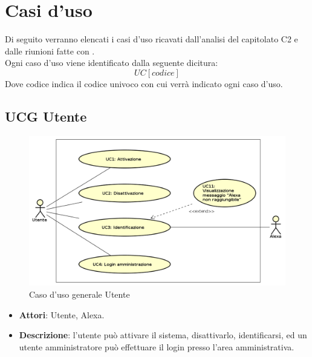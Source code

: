 \documentclass[../AnalisiDeiRequisiti.tex]{subfiles}
\begin{document}
\section{Casi d'uso}
Di seguito verranno elencati i casi d'uso ricavati dall'analisi del capitolato C2 e dalle riunioni fatte con \prop.\\
Ogni caso d'uso viene identificato dalla seguente dicitura:
\begin{equation*}
	UC[codice]
\end{equation*}
Dove codice indica il codice univoco con cui verrà indicato ogni caso d'uso.

\subsection{UCG Utente} 
\label{sssec:UCG_Utente}
\begin{figure}[!h]
	\centering
	\includegraphics[width=\textwidth]{UseCases/UCG_Utente/UCG_Utente.png}
	\caption{Caso d'uso generale Utente}
\end{figure}
\begin{itemize} 
\item \textbf{Attori}: Utente, Alexa.
\item \textbf{Descrizione}: l'utente può attivare il sistema, disattivarlo, identificarsi, ed un utente amministratore può effettuare il login presso l'area amministrativa.
\end{itemize}
\newpage
\end{document}
